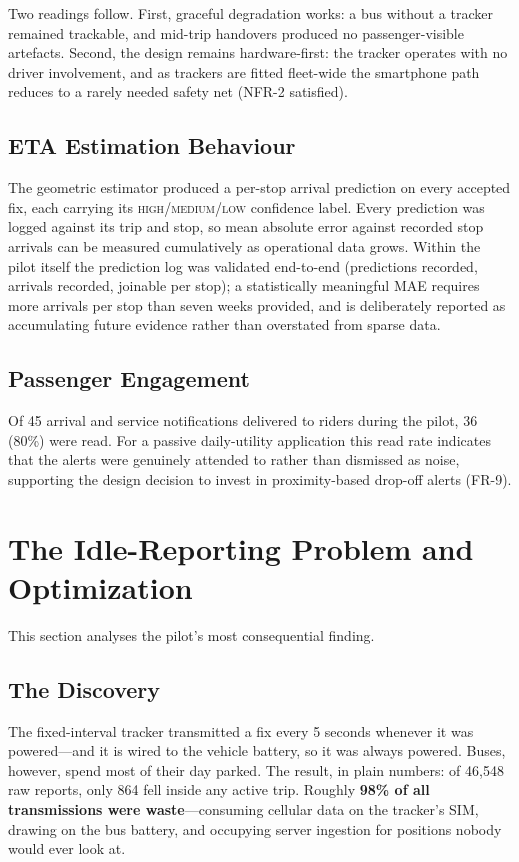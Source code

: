 Two readings follow. First, graceful degradation works: a bus without a
tracker remained trackable, and mid-trip handovers produced no
passenger-visible artefacts. Second, the design remains hardware-first:
the tracker operates with no driver involvement, and as trackers are
fitted fleet-wide the smartphone path reduces to a rarely needed safety
net (NFR-2 satisfied).

\subsection{ETA Estimation Behaviour}
\label{sec:eval-eta}
The geometric estimator produced a per-stop arrival prediction on every
accepted fix, each carrying its \textsc{high}/\textsc{medium}/\textsc{low}
confidence label. Every prediction was logged against its trip and stop,
so mean absolute error against recorded stop arrivals can be measured
cumulatively as operational data grows. Within the pilot itself the
prediction log was validated end-to-end (predictions recorded, arrivals
recorded, joinable per stop); a statistically meaningful MAE requires
more arrivals per stop than seven weeks provided, and is deliberately
reported as accumulating future evidence rather than overstated from
sparse data.

\subsection{Passenger Engagement}
\label{sec:eval-engagement}
Of 45 arrival and service notifications delivered to riders during the
pilot, 36 (80\%) were read. For a passive daily-utility application this
read rate indicates that the alerts were genuinely attended to rather
than dismissed as noise, supporting the design decision to invest in
proximity-based drop-off alerts (FR-9).

\section{The Idle-Reporting Problem and Optimization}
\label{sec:eval-efficiency}
This section analyses the pilot's most consequential finding.

\subsection{The Discovery}
The fixed-interval tracker transmitted a fix every 5 seconds whenever it
was powered---and it is wired to the vehicle battery, so it was always
powered. Buses, however, spend most of their day parked. The result, in
plain numbers: of 46{,}548 raw reports, only 864 fell inside any active
trip. Roughly \textbf{98\% of all transmissions were waste}---consuming
cellular data on the tracker's SIM, drawing on the bus battery, and
occupying server ingestion for positions nobody would ever look at.

